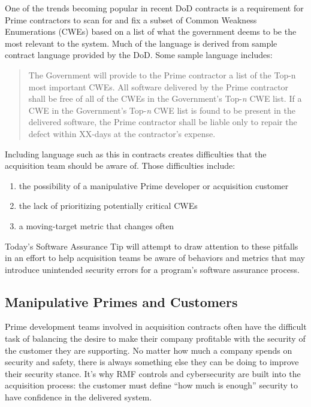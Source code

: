 One of the trends becoming popular in recent DoD contracts is a requirement for Prime contractors to scan for and fix a subset of Common Weakness Enumerations (CWEs) based on a list of what the government deems to be the most relevant to the system. Much of the language is derived from sample contract language provided by the DoD. Some sample language includes:
\begin{quote}
The Government will provide to the Prime contractor a list of the Top-n most important CWEs. All software delivered by the Prime contractor shall be free of all of the CWEs in the Government's Top-\textit{n} CWE list. If a CWE in the Government's Top-\textit{n} CWE list is found to be present in the delivered software, the Prime contractor shall be liable only to repair the defect within XX-days at the contractor's expense.\autocite{20220613:marien}
\end{quote}

Including language such as this in contracts creates difficulties that the acquisition team should be aware of. Those difficulties include:
\begin{enumerate}
	\item the possibility of a manipulative Prime developer or acquisition customer
	\item the lack of prioritizing potentially critical CWEs
	\item a moving-target metric that changes often
\end{enumerate}

Today's Software Assurance Tip will attempt to draw attention to these pitfalls in an effort to help acquisition teams be aware of behaviors and metrics that may introduce unintended security errors for a program's software assurance process.

\subsection{Manipulative Primes and Customers}
Prime development teams involved in acquisition contracts often have the difficult task of balancing the desire to make their company profitable with the security of the customer they are supporting. No matter how much a company spends on security and safety, there is always something else they can be doing to improve their security stance. It's why RMF controls and cybersecurity are built into the acquisition process: the customer must define ``how much is enough'' security to have confidence in the delivered system.

